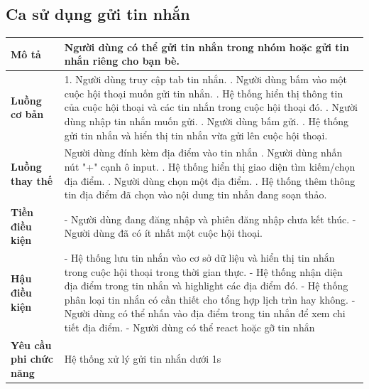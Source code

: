 \subsection{Ca sử dụng gửi tin nhắn}
\vspace{0.5cm}


\noindent 
\begin{tabularx}{\linewidth}{| l | X |} 
\hline 
\textbf{Mô tả} & Người dùng có thể gửi tin nhắn trong nhóm hoặc gửi tin nhắn riêng cho bạn bè.  \\ 
\hline 
\textbf{Luồng cơ bản} & 1. Người dùng truy cập tab tin nhắn. \newline
                        2. Người dùng bấm vào một cuộc hội thoại muốn gửi tin nhắn. \newline
                        3. Hệ thống hiển thị thông tin của cuộc hội thoại và các tin nhắn trong cuộc hội thoại đó. \newline
                        4. Người dùng nhập tin nhắn muốn gửi. \newline
                        5. Người dùng bấm gửi. \newline
                        6. Hệ thống gửi tin nhắn và hiển thị tin nhắn vừa gửi lên cuộc hội thoại. \\
                        
\hline 
\textbf{Luồng thay thế} & Người dùng đính kèm địa điểm vào tin nhắn \newline
   1. Người dùng nhấn nút "+" cạnh ô input. \newline
   2. Hệ thống hiển thị giao diện tìm kiếm/chọn địa điểm. \newline
   3. Người dùng chọn một địa điểm. \newline
   4. Hệ thống thêm thông tin địa điểm đã chọn vào nội dung tin nhắn đang soạn thảo. \\

                       
\hline 
\textbf{Tiền điều kiện} &- Người dùng đang đăng nhập và phiên đăng nhập chưa kết thúc. \newline
                        - Người dùng đã có ít nhất một cuộc hội thoại. \\
\hline 
\textbf{Hậu điều kiện} & - Hệ thống lưu tin nhắn vào cơ sở dữ liệu và hiển thị tin nhắn trong cuộc hội thoại trong thời gian thực. \newline
                        - Hệ thống nhận diện địa điểm trong tin nhắn và highlight các địa điểm đó. \newline
                        - Hệ thống phân loại tin nhắn có cần thiết cho tổng hợp lịch trìn hay không. \newline
                        - Người dùng có thể nhấn vào địa điểm trong tin nhắn để xem chi tiết địa điểm. \newline
                        - Người dùng có thể react hoặc gỡ tin nhắn\\

\hline 
\textbf{Yêu cầu phi chức năng} & Hệ thống xử lý gửi tin nhắn dưới 1s  \\ 
\hline 
\end{tabularx}



